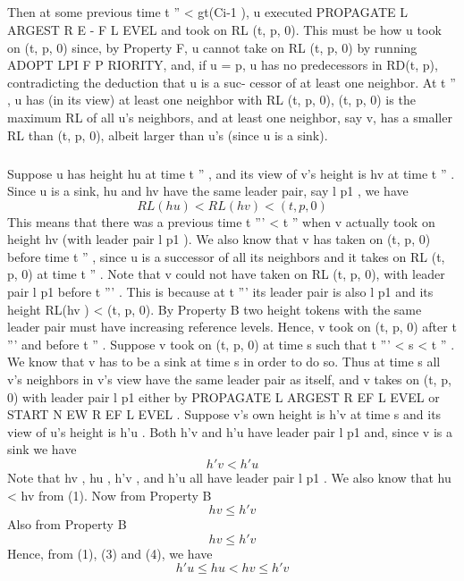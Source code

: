 \subparagraph{}Then at some previous time t '' < gt(Ci-1 ), u executed PROPAGATE L ARGEST R E - F L EVEL and took on RL (t, p, 0). This must be how u took on (t, p, 0) since, by Property F, u cannot take on RL (t, p, 0) by running ADOPT LPI F P RIORITY, and, if u = p, u has no predecessors in RD(t, p), contradicting the deduction that u is a suc- cessor of at least one neighbor. At t '' , u has (in its view) at least one neighbor with RL (t, p, 0), (t, p, 0) is the maximum RL of all u's neighbors, and at least one neighbor, say v, has a smaller RL than (t, p, 0), albeit larger than u's (since u is a sink).
\subparagraph{}Suppose u has height hu at time t '' , and its view of v's height is hv at time t '' . Since u is a sink, hu and hv have the same leader pair, say l p1 , we have
\begin{equation}
RL(hu ) < RL(hv ) < (t, p, 0)
\end{equation}
This means that there was a previous time t ''' < t '' when v actually took on height hv (with leader pair l p1 ). We also know that v has taken on (t, p, 0) before time t '' , since u is a successor of all its neighbors and it takes on RL (t, p, 0) at time t '' . Note that v could not have taken on RL (t, p, 0), with leader pair l p1 before t ''' . This is because at t ''' its leader pair is also l p1 and its height RL(hv ) < (t, p, 0). By Property B two height tokens with the same leader pair must have increasing reference levels. Hence, v took on (t, p, 0) after t ''' and before t '' . Suppose v took on (t, p, 0) at time s such that t ''' < s < t '' . We know that v has to be a sink at time s in order to do so. Thus at time s all v's neighbors in v's view have the same leader pair as itself, and v takes on (t, p, 0) with leader pair l p1 either by PROPAGATE L ARGEST R EF L EVEL or START N EW R EF L EVEL . Suppose v's own height is h'v at time s and its view of u's height is h'u . Both h'v and h'u have leader pair l p1 and, since v is a sink we have
\begin{equation}
h'v < h'u
\end{equation}
Note that hv , hu , h'v , and h'u all have leader pair l p1 . We also know that hu < hv from (1). Now from Property B
\begin{equation}
hv \leq h'v
\end{equation}
Also from Property B
\begin{equation}
hv \leq h'v
\end{equation}
Hence, from (1), (3) and (4), we have
\begin{equation}
h'u \leq hu < hv \leq h'v
\end{equation}
